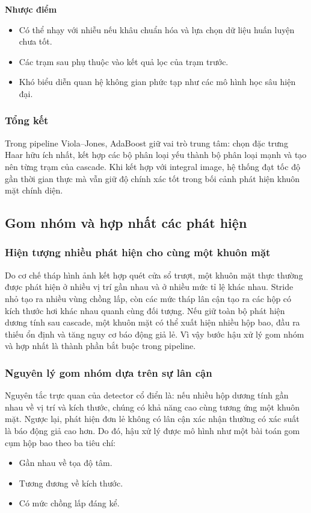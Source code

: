 \noindent\textbf{Nhược điểm}
\begin{itemize}
  \item Có thể nhạy với nhiễu nếu khâu chuẩn hóa và lựa chọn dữ liệu huấn luyện chưa tốt.
  \item Các trạm sau phụ thuộc vào kết quả lọc của trạm trước.
  \item Khó biểu diễn quan hệ không gian phức tạp như các mô hình học sâu hiện đại.
\end{itemize}

\subsubsection{Tổng kết}

Trong pipeline Viola--Jones, AdaBoost giữ vai trò trung tâm:
chọn đặc trưng Haar hữu ích nhất, kết hợp các bộ phân loại yếu thành bộ phân loại mạnh và tạo nên từng trạm của cascade.
Khi kết hợp với integral image, hệ thống đạt tốc độ gần thời gian thực mà vẫn giữ độ chính xác tốt trong bối cảnh phát hiện khuôn mặt chính diện.  \cite{viola2001rapid,viola2004robust,li2012facechapter}

\subsection{Gom nhóm và hợp nhất các phát hiện}

\subsubsection{Hiện tượng nhiều phát hiện cho cùng một khuôn mặt}

Do cơ chế tháp hình ảnh kết hợp quét cửa sổ trượt, một khuôn mặt thực thường được phát hiện ở nhiều vị trí gần nhau và ở nhiều mức tỉ lệ khác nhau.
Stride nhỏ tạo ra nhiều vùng chồng lấp, còn các mức tháp lân cận tạo ra các hộp có kích thước hơi khác nhau quanh cùng đối tượng.
Nếu giữ toàn bộ phát hiện dương tính sau cascade, một khuôn mặt có thể xuất hiện nhiều hộp bao, đầu ra thiếu ổn định và tăng nguy cơ báo động giả lẻ.
Vì vậy bước hậu xử lý gom nhóm và hợp nhất là thành phần bắt buộc trong pipeline.  \cite{li2012facechapter,opencv_cascade_docs}

\subsubsection{Nguyên lý gom nhóm dựa trên sự lân cận}

Nguyên tắc trực quan của detector cổ điển là:
nếu nhiều hộp dương tính gần nhau về vị trí và kích thước, chúng có khả năng cao cùng tương ứng một khuôn mặt.
Ngược lại, phát hiện đơn lẻ không có lân cận xác nhận thường có xác suất là báo động giả cao hơn.
Do đó, hậu xử lý được mô hình như một bài toán gom cụm hộp bao theo ba tiêu chí:
\begin{itemize}
  \item Gần nhau về tọa độ tâm.
  \item Tương đương về kích thước.
  \item Có mức chồng lấp đáng kể.
\end{itemize}

